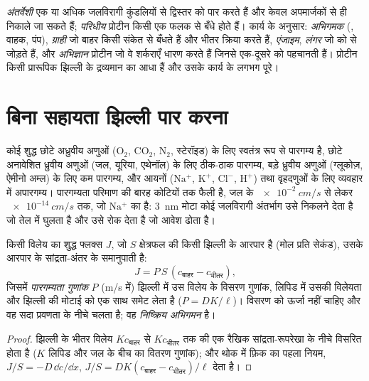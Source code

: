 \begin{definition}[झिल्ली प्रोटीन]\label{def:b1:membranes-transport:proteins}
\emph{अंतर्वेशी}  एक या अधिक
जलविरागी कुंडलियों से द्विस्तर को पार करते हैं और केवल अपमार्जकों से ही
निकाले जा सकते हैं; \emph{परिधीय} प्रोटीन किसी एक फलक से बँधे होते हैं।
कार्य के अनुसार: \emph{अभिगमक} (, वाहक, पंप), \emph{ग्राही} जो बाहर
किसी संकेत से बँधते हैं और भीतर क्रिया करते हैं, \emph{एंजाइम},
\emph{लंगर} जो  को  से जोड़ते हैं, और
\emph{अभिज्ञान} प्रोटीन जो वे शर्कराएँ धारण करते हैं जिनसे 
एक-दूसरे को पहचानती हैं। प्रोटीन किसी प्रारूपिक झिल्ली के द्रव्यमान का
आधा हैं और उसके कार्य के लगभग पूरे।
\end{definition}

\section{बिना सहायता झिल्ली पार करना}

\begin{proposition}[द्विस्तर की पारगम्यता]\label{prop:b1:membranes-transport:permeability}
कोई शुद्ध  छोटे अध्रुवीय अणुओं ($\mathrm{O_2}$,
$\mathrm{CO_2}$, $\mathrm{N_2}$, स्टेरॉइड) के लिए स्वतंत्र रूप से
पारगम्य है, छोटे अनावेशित ध्रुवीय अणुओं (जल, यूरिया, एथेनॉल) के लिए
ठीक-ठाक पारगम्य, बड़े ध्रुवीय अणुओं (ग्लूकोज़, ऐमीनो अम्ल) के लिए कम
पारगम्य, और आयनों ($\mathrm{Na^+}$, $\mathrm{K^+}$, $\mathrm{Cl^-}$,
$\mathrm{H^+}$) तथा वृहदणुओं के लिए व्यवहार में अपारगम्य। पारगम्यता
परिमाण की बारह कोटियों तक फैली है, जल के
$\qty{e-2}{cm/s}$ से लेकर $\qty{e-14}{cm/s}$ तक, जो $\mathrm{Na^+}$ का है:
\qty{3}{nm} मोटा कोई जलविरागी अंतर्भाग उसे निकलने देता है जो तेल में
घुलता है और उसे रोक देता है जो आवेश ढोता है।
\end{proposition}

\begin{theorem}[फ़िक का विसरण नियम]\label{thm:b1:membranes-transport:fick}
किसी विलेय का शुद्ध फ्लक्स $J$, जो $S$ क्षेत्रफल की किसी झिल्ली के
आरपार है (मोल प्रति सेकंड), उसके आरपार के सांद्रता-अंतर के समानुपाती है:
\[
J = P\,S\,(c_{\text{बाहर}} - c_{\text{भीतर}}),
\]
जिसमें \emph{पारगम्यता गुणांक} $P$ (\unit{m/s} में) झिल्ली में उस विलेय
के विसरण गुणांक, लिपिड में उसकी विलेयता और झिल्ली की मोटाई को एक साथ
समेट लेता है ($P = DK/\ell$)। विसरण को ऊर्जा नहीं चाहिए और वह सदा
प्रवणता के नीचे चलता है; वह \emph{निष्क्रिय
अभिगमन} है।
\end{theorem}
\begin{proof}
झिल्ली के भीतर विलेय $Kc_{\text{बाहर}}$ से $Kc_{\text{भीतर}}$ तक की एक
रैखिक सांद्रता-रूपरेखा के नीचे विसरित होता है ($K$ लिपिड और जल के बीच
का वितरण गुणांक); और थोक में फ़िक का पहला नियम,
$J/S = -D\,\dd c/\dd x$, $J/S = DK(c_{\text{बाहर}} -
c_{\text{भीतर}})/\ell$ देता है।
\end{proof}

